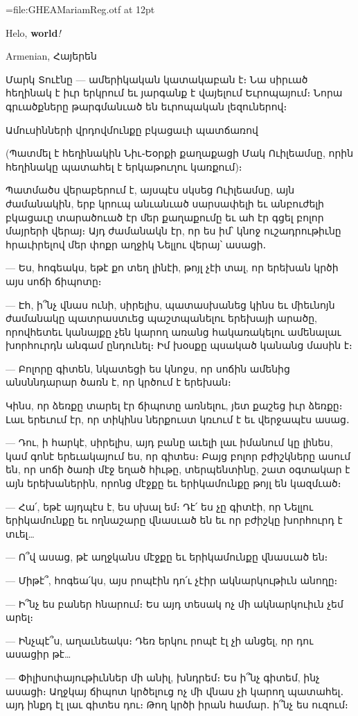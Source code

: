 

\font\hyten=file:GHEAMariamReg.otf at 12pt

Helo, {\bf world}{\it !}

\hyten
Armenian, Հայերեն

Մարկ Տուէնը — ամերիկական կատակաբան է։ Նա սիրւած հեղինակ է իւր երկրում եւ յարգանք է վայելում Եւրոպայում։ Նորա գրւածքները թարգմանւած են եւրոպական լեզուներով։

Ամուսինների վրդովմունքը բկացաւի պատճառով

(Պատմել է հեղինակին Նիւ֊Եօրքի քաղաքացի Մակ Ուիլեամսը, որին հեղինակը պատահել է երկաթուղու կառքում)։

Պատմածս վերաբերում է, այսպէս սկսեց Ուիլեամսը, այն ժամանակին, երբ կրուպ անւանւած սարսափելի եւ անբուժելի բկացաւը տարածուած էր մեր քաղաքումը եւ ահ էր գցել բոլոր մայրերի վերայ։ Այդ ժամանակն էր, որ ես իմ՝ կնոջ ուշադրութիւնը հրաւիրելով մեր փոքր աղջիկ Նելլու վերայ՝ ասացի․

— Ես, հոգեակս, եթէ քո տեղ լինէի, թոյլ չէի տալ, որ երեխան կրծի այս սոճի ճիպոտը։

— Էհ, ի՞նչ վնաս ունի, սիրելիս, պատասխանեց կինս եւ միեւնոյն ժամանակը պատրաստւեց պաշտպանելու երեխայի արածը, որովհետեւ կանայքը չեն կարող առանց հակառակելու ամենալաւ խորհուրդն անգամ ընդունել։ Իմ խօսքը պսակած կանանց մասին է։

— Բոլորը գիտեն, նկատեցի ես կնոջս, որ սոճին ամենից անսննդարար ծառն է, որ կրծում է երեխան։

Կինս, որ ձեռքը տարել էր ճիպոտը առնելու, յետ քաշեց իւր ձեռքը։ Լաւ երեւում էր, որ տիկինս ներքուստ կռւում է եւ վերջապէս ասաց․

— Դու, ի հարկէ, սիրելիս, այդ բանը աւելի լաւ իմանում կը լինես, կամ գոնէ երեւակայում ես, որ գիտես։ Բայց բոլոր բժիշկները ասում են, որ սոճի ծառի մէջ եղած հիւթը, տերպենտինը, շատ օգտակար է այն երեխաներին, որոնց մէջքը եւ երիկամունքը թոյլ են կազմւած։

— Հա՛, եթէ այդպէս է, ես սխալ եմ։ Դէ՛ ես չը գիտէի, որ Նելլու երիկամունքը եւ ողնաշարը վնասւած են եւ որ բժիշկը խորհուրդ է տւել…

— Ո՞վ ասաց, թէ աղջկանս մէջքը եւ երիկամունքը վնասւած են։

— Միթէ՞, հոգեա՛կս, այս րոպէին դո՛ւ չէիր ակնարկութիւն անողը։

— Ի՞նչ ես բաներ հնարում։ Ես այդ տեսակ ոչ մի ակնարկուիւն չեմ արել։

— Ինչպէ՞ս, աղաւնեակս։ Դեռ երկու րոպէ էլ չի անցել, որ դու ասացիր թէ…

— Փիլիսոփայութիւններ մի անիլ, խնդրեմ։ Ես ի՞նչ գիտեմ, ինչ ասացի։ Աղջկայ ճիպոտ կրծելուց ոչ մի վնաս չի կարող պատահել․ այդ ինքդ էլ լաւ գիտես դու։ Թող կրծի իրան համար․ ի՞նչ ես ուզում։

